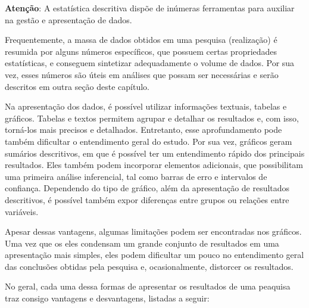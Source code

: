 \documentclass[
]{book}
\begin{document}
\begin{warning}

\textbf{Atenção}: A estatística descritiva dispõe de inúmeras
ferramentas para auxiliar na gestão e apresentação de dados.

\end{warning}

Frequentemente, a massa de dados obtidos em uma pesquisa (realização) é
resumida por alguns números específicos, que possuem certas propriedades
estatísticas, e conseguem sintetizar adequadamente o volume de dados.
Por sua vez, esses números são úteis em análises que possam ser
necessárias e serão descritos em outra seção deste capítulo.

Na apresentação dos dados, é possível utilizar informações textuais,
tabelas e gráficos. Tabelas e textos permitem agrupar e detalhar os
resultados e, com isso, torná-los mais precisos e detalhados.
Entretanto, esse aprofundamento pode também dificultar o entendimento
geral do estudo. Por sua vez, gráficos geram sumários descritivos, em
que é possível ter um entendimento rápido dos principais resultados.
Eles também podem incorporar elementos adicionais, que possibilitam uma
primeira análise inferencial, tal como barras de erro e intervalos de
confiança. Dependendo do tipo de gráfico, além da apresentação de
resultados descritivos, é possível também expor diferenças entre grupos
ou relações entre variáveis.

Apesar dessas vantagens, algumas limitações podem ser encontradas nos
gráficos. Uma vez que os eles condensam um grande conjunto de resultados
em uma apresentação mais simples, eles podem dificultar um pouco no
entendimento geral das conclusões obtidas pela pesquisa e,
ocasionalmente, distorcer os resultados.

No geral, cada uma dessa formas de apresentar os resultados de uma
peaquisa traz consigo vantagens e desvantagens, listadas a seguir:
\end{document}
